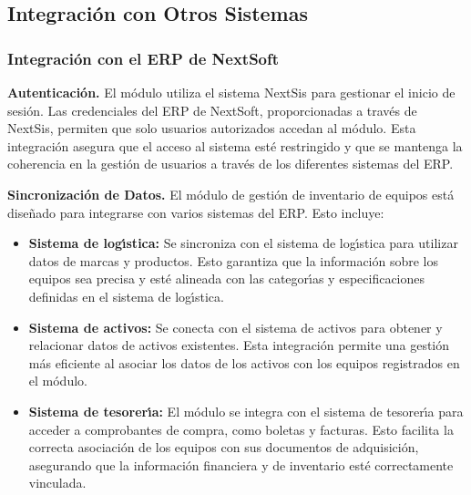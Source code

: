 \documentclass[stu, 12pt, letterpaper, donotrepeattitle, floatsintext, natbib]{apa7}
\begin{document}
\subsection{Integraci\'on con Otros Sistemas}
\subsubsection{Integraci\'on con el ERP de NextSoft}
\textbf{Autenticaci\'on. }El m\'odulo utiliza el sistema NextSis para gestionar el inicio de sesi\'on. Las credenciales del ERP de NextSoft, proporcionadas a trav\'es de NextSis, permiten que solo usuarios autorizados accedan al m\'odulo. Esta integraci\'on asegura que el acceso al sistema est\'e restringido y que se mantenga la coherencia en la gesti\'on de usuarios a trav\'es de los diferentes sistemas del ERP.

\textbf{Sincronizaci\'on de Datos. }El m\'odulo de gesti\'on de inventario de equipos est\'a dise\~{n}ado para integrarse con varios sistemas del ERP. Esto incluye:
\begin{itemize}
    \item\textbf{Sistema de log\'{\i}stica: }Se sincroniza con el sistema de log\'{\i}stica para utilizar datos de marcas y productos. Esto garantiza que la informaci\'on sobre los equipos sea precisa y est\'e alineada con las categor\'{\i}as y especificaciones definidas en el sistema de log\'{\i}stica.
    \item\textbf{Sistema de activos: }Se conecta con el sistema de activos para obtener y relacionar datos de activos existentes. Esta integraci\'on permite una gesti\'on m\'as eficiente al asociar los datos de los activos con los equipos registrados en el m\'odulo.
    \item\textbf{Sistema de tesorer\'{\i}a: }El m\'odulo se integra con el sistema de tesorer\'{\i}a para acceder a comprobantes de compra, como boletas y facturas. Esto facilita la correcta asociaci\'on de los equipos con sus documentos de adquisici\'on, asegurando que la informaci\'on financiera y de inventario est\'e correctamente vinculada.
\end{itemize}
\end{document}
